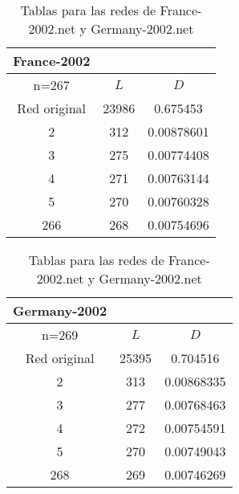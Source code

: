 \begin{table}[H]
  \begin{minipage}{0.45\textwidth}
      \begin{tabular}{ccc}
       France-2002 & & \\
          \hline
            n=267             & $L$ &  $D$  \\
            \hline
            Red original &               23986 & 0.675453   \\
            2            &                 312 & 0.00878601 \\
            3            &                 275 & 0.00774408 \\
            4            &                 271 & 0.00763144 \\
            5            &                 270 & 0.00760328 \\
            266          &                 268 & 0.00754696 \\
            \hline
     \end{tabular}
  \end{minipage}
  \begin{minipage}{0.45\textwidth}
      \begin{tabular}{ccc}
         Germany-2002 & & \\
         \hline
         n=269              &   $L$ &   $D$ \\
         \hline
         Red original &               25395 & 0.704516   \\
         2            &                 313 & 0.00868335 \\
         3            &                 277 & 0.00768463 \\
         4            &                 272 & 0.00754591 \\
         5            &                 270 & 0.00749043 \\
         268          &                 269 & 0.00746269 \\
        \hline
     \end{tabular}
  \end{minipage}
  \label{fr-gr}
  \caption{Tablas para las redes de France-2002.net y Germany-2002.net}
\end{table}
